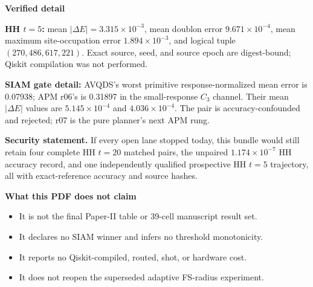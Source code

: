\documentclass[9pt,letterpaper,landscape]{article}
\newcommand{\statusbox}[2]{\colorbox{#1}{\parbox{0.965\linewidth}{\strut #2\strut}}}
\begin{document}
\vspace{6pt}
\begin{minipage}[t]{0.56\linewidth}
{\large\bfseries\color{navy}Verified detail}

{\bfseries HH \(t=5\):} mean \(|\Delta E|=3.315\times10^{-3}\), mean doublon error \(9.671\times10^{-4}\), mean maximum site-occupation error \(1.894\times10^{-3}\), and logical tuple \((270,486,617,221)\). Exact source, seed, and source epoch are digest-bound; Qiskit compilation was not performed.

{\bfseries SIAM gate detail:} AVQDS's worst primitive response-normalized mean error is 0.07938; APM r06's is 0.31897 in the small-response \(C_3\) channel. Their mean \(|\Delta E|\) values are \(5.145\times10^{-4}\) and \(4.036\times10^{-4}\). The pair is accuracy-confounded and rejected; r07 is the pure planner's next APM rung.

\vspace{4pt}
\statusbox{greenpale}{\textbf{Security statement.} If every open lane stopped today, this bundle would still retain four complete HH \(t=20\) matched pairs, the unpaired \(1.174\times10^{-7}\) HH accuracy record, and one independently qualified prospective HH \(t=5\) trajectory, all with exact-reference accuracy and source hashes.}

\vspace{5pt}
{\large\bfseries\color{navy}What this PDF does not claim}
\begin{itemize}
  \item It is not the final Paper-II table or 39-cell manuscript result set.
  \item It declares no SIAM winner and infers no threshold monotonicity.
  \item It reports no Qiskit-compiled, routed, shot, or hardware cost.
  \item It does not reopen the superseded adaptive FS-radius experiment.
\end{itemize}
\end{minipage}\hfill
\end{document}
